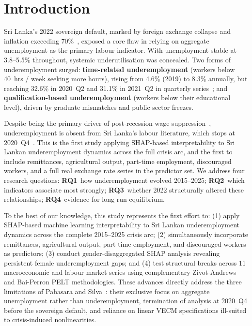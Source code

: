 \documentclass[sigconf]{acmart}
\begin{document}

\maketitle

\section{Introduction}

Sri Lanka's 2022 sovereign default, marked by foreign exchange collapse
and inflation exceeding 70\%~\cite{cbsl2025}, exposed a core flaw in
relying on aggregate unemployment as the primary labour indicator. With
unemployment stable at 3.8--5.5\% throughout, systemic underutilisation
was concealed. Two forms of underemployment surged: \textbf{time-related
underemployment} (workers below 40~hrs / week seeking more hours), rising
from 4.6\% (2019) to 8.3\% annually, but reaching 32.6\% in 2020~Q2 and
31.1\% in 2021~Q2 in quarterly series~\cite{dcs2025}; and
\textbf{qualification-based underemployment} (workers below their
educational level), driven by graduate mismatches and public sector
freezes.

Despite being the primary driver of post-recession wage
suppression~\cite{bell2018underemployment}, underemployment is absent from
Sri Lanka's labour literature, which stops at 2020~Q4~\cite{pabasara2025impact}.
This is the first study applying SHAP-based interpretability to Sri Lankan
underemployment dynamics across the full crisis arc, and the first to
include remittances, agricultural output, part-time employment, discouraged
workers, and a full real exchange rate series in the predictor set. We
address four research questions: \textbf{RQ1}~how underemployment evolved
2015--2025; \textbf{RQ2}~which indicators associate most strongly;
\textbf{RQ3}~whether 2022 structurally altered these relationships;
\textbf{RQ4}~evidence for long-run equilibrium.

To the best of our knowledge, this study represents the first effort
to: (1) apply SHAP-based machine learning interpretability to Sri Lankan
underemployment dynamics across the complete 2015--2025 crisis arc;
(2) simultaneously incorporate remittances, agricultural output, part-time
employment, and discouraged workers as predictors; (3) conduct
gender-disaggregated SHAP analysis revealing persistent female
underemployment gaps; and (4) test structural breaks across 11
macroeconomic and labour market series using complementary Zivot-Andrews
and Bai-Perron PELT methodologies. These advances directly address the
three limitations of Pabasara and Silva~\cite{pabasara2025impact}: their
exclusive focus on aggregate unemployment rather than underemployment,
termination of analysis at 2020~Q4 before the sovereign default, and
reliance on linear VECM specifications ill-suited to crisis-induced
nonlinearities.
\end{document}
